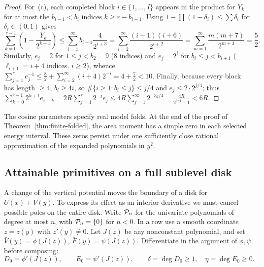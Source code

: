 \begin{proof}
For~(c), each completed block $i\in\{1,\dots,I\}$ appears in the product for $Y_k$ for at most the $b_{i-1}<b_i$ indices $k\ge r-b_{i-1}$. Using $1-\prod(1-\delta_i)\le\sum\delta_i$ for $\delta_i\in(0,1)$ gives
\[
  \sum_{k=0}^{r-1}\left(1-\frac{Y_k}{2^{k+1}}\right)
  \le \sum_{i=1}^\infty b_{i-1}\frac{4}{2^{i+3}}
  = \sum_{i=2}^\infty \frac{(i-1)(i+6)}{2^{i+2}}
  = \sum_{m=1}^\infty \frac{m(m+7)}{2^{m+3}} = \frac{5}{2}.
\]
Similarly, $e_j=2$ for $1\le j<b_2=9$ ($8$ indices) and $e_j=2^i$ for $b_i\le j<b_{i+1}$ ($\ell_{i+1}=i+4$ indices, $i\ge 2$), whence $\sum_{j=1}^r e_j^{-1}\le \frac{8}{2}+\sum_{i=2}^\infty (i+4)2^{-i}=4+\frac{7}{2}<10$. Finally, because every block has length $\ge 4$, $b_i\ge 4i$, so $\#\{i\ge 1:b_i\le j\}\le j/4$ and $e_j\le 2\cdot 2^{j/4}$; thus $\sum_{k=0}^{r-1}2^{k+1}e_{r-k}=2R\sum_{j=1}^r 2^{-j}e_j\le 4R\sum_{j=1}^\infty 2^{-3j/4}=\frac{4R}{2^{3/4}-1}<6R$.
\end{proof}

The cosine parameters specify real model folds. At the end of the proof of Theorem~\ref{thm:finite-folded}, the area moment has a simple zero in each selected energy interval. These zeros persist under one sufficiently close rational approximation of the expanded polynomials in \(y^2\).


\subsection{Attainable primitives on a full sublevel disk}

A change of the vertical potential moves the boundary of a disk for \(U(x)+V(y)\). To express its effect as an interior derivative we must cancel possible poles on the entire disk. Write \(\mathcal{P}_n\) for the univariate polynomials of degree at most \(n\), with \(\mathcal{P}_n=\{0\}\) for \(n<0\). In a row use a smooth coordinate $z=z(y)$ with $z'(y)\ne0$. Let $J(z)$ be any nonconstant polynomial, and set $\bar V(y)=\phi(J(z))$, $\bar F(y)=\psi(J(z))$. Differentiate in the argument of $\phi,\psi$ before composing:
\[
 D_0=\phi'(J(z)),\qquad E_0=\psi'(J(z)),\qquad
 \delta=\deg D_0\ge1,\quad \eta=\deg E_0\ge0 .
\]

